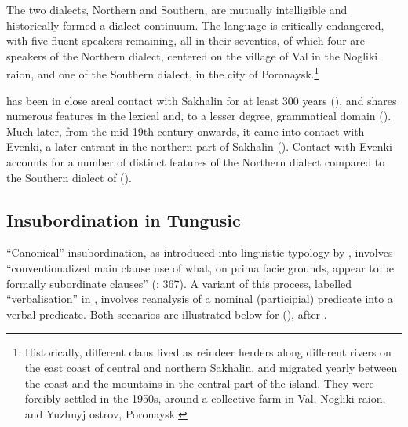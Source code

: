 \documentclass[output=paper,colorlinks,citecolor=brown]{langscibook}
\begin{document}
The two  dialects, Northern and Southern, are mutually intelligible and historically formed a dialect continuum. The language is critically endangered, with five fluent speakers remaining, all in their seventies, of which four are speakers of the Northern dialect, centered on the village of Val in the Nogliki raion, and one of the Southern dialect, in the city of Poronaysk.\footnote{Historically, different  clans lived as reindeer herders along different rivers on the east coast of central and northern Sakhalin, and migrated yearly between the coast and the mountains in the central part of the island. They were forcibly settled in the 1950s, around a collective farm in Val, Nogliki raion, and Yuzhnyj ostrov, Poronaysk.}

 has been in close areal contact with Sakhalin  for at least 300 years (\citealt{Yamada_2010a}), and shares numerous features in the lexical and, to a lesser degree, grammatical domain (\citealt{Pevnov_2016}). Much later, from the mid-19th century onwards, it came into contact with  Evenki, a later entrant in the northern part of Sakhalin (\citealt{Yamada_2010a}). Contact with  Evenki accounts for a number of distinct features of the Northern dialect compared to the Southern dialect of  (\citealt{Ikegami_1994}).


\subsection{Insubordination in Tungusic}\label{Section3.1.3}
\begin{sloppypar}
“Canonical” insubordination, as introduced into linguistic typology by \citet{Evans_2007}, involves “conventionalized main clause use of what, on prima facie grounds, appear to be formally subordinate clauses” (\citealt{Evans_2007}: 367). A variant of this process, labelled “verbalisation” in \citet{Malchukov_2013}, involves reanalysis of a nominal (participial) predicate into a verbal predicate. Both scenarios are illustrated below for  (), after \citet{Malchukov_2013}.
\end{sloppypar}
\end{document}
